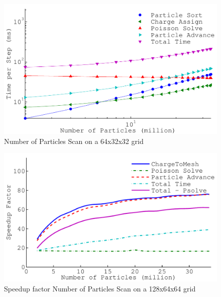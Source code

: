 \begin{figure}
\begin{center}
\includegraphics[width=6in]{performance/nptclsize_scan64x32x32ons8bins.pdf}
\end{center}
\caption{Number of Particles Scan on a 64x32x32 grid}
\label{fig:nptclsize_scan128x64x64}
\end{figure}

\begin{figure}
\begin{center}
\includegraphics[width=6in]{performance/nptclspeedup_scan128x64x64ons8bins.pdf}
\end{center}
\caption{Speedup factor Number of Particles Scan on a 128x64x64 grid}
\label{fig:nptclsize_scan128x64x64}
\end{figure}



